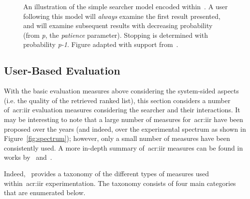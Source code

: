 \begin{figure}[t!]
    \centering
    \caption[Rank-Biased Precision]{An illustration of the simple searcher model encoded within~. A user following this model will \emph{always} examine the first result presented, and will examine subsequent results with decreasing probability (from \emph{p}, the \emph{patience} parameter). Stopping is determined with probability \emph{p-1}. Figure adapted with support from~\cite{moffat2008rbp}.}
    \label{fig:rbp}
\end{figure}

\subsection{User-Based Evaluation}\label{sec:ir_background:evaluation:user}
With the basic evaluation measures above considering the system-sided aspects (i.e. the quality of the retrieved ranked list), this section considers a number of~\gls{acr:iir} evaluation measures considering the searcher and their interactions. It may be interesting to note that a large number of measures for~\gls{acr:iir} have been proposed over the years (and indeed, over the experimental spectrum as shown in Figure~\ref{fig:spectrum}); however, only a small number of measures have been consistently used. A more in-depth summary of~\gls{acr:iir} measures can be found in works by~\cite{su1992iir_measures} and~\cite{kelly2009iir}.

Indeed,~\cite{kelly2009iir} provides a taxonomy of the different types of measures used within~\gls{acr:iir} experimentation. The taxonomy consists of four main categories that are enumerated below.

